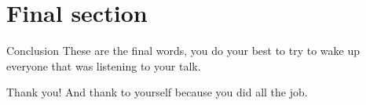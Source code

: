 \documentclass[10pt, xcolor = svgnames]{beamer} %
\begin{document}
\section{Final section}



\begin{frame}{Conclusion}
    These are the final words, you do your best to try to wake up everyone that was listening to your talk.
\end{frame}


{ %
\begin{frame}[standout]
  Thank you! And thank to yourself because you did all the job. 
\end{frame}
}
%

\end{document}
